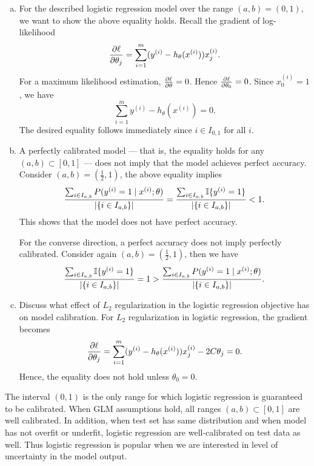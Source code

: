 \documentclass[12pt,letterpaper,boxed]{hmcpset}
\newcommand{\yy}{y^{(i)}}
\newcommand{\xx}{x^{(i)}}
\newcommand{\ind}[1]{\mathbb{I}\{#1\}}
\begin{document}
\begin{solution}
  \begin{enumerate}[(a)]
    \item For the described logistic regression model over the range $(a,b) = (0,1)$, we want to show the above equality holds. Recall the gradient of log-likelihood
    \[
    \pdv{\ell}{\theta_j} = \sum_{i=1}^m (\yy - h_{\theta}(\xx)) \xx_j.
    \]
    For a maximum likelihood estimation, $\pdv{\ell}{\theta} = 0$. Hence $\pdv{\ell}{\theta_0} = 0$. Since $\xx_0 = 1$, we have
    \[
    \sum_{i=1}^{m} \yy - h_\theta(\xx) = 0.
    \]
    The desired equality follows immediately since $i \in I_{0,1}$ for all $i$.

    \item A perfectly calibrated model — that is, the equality holds for any $(a,b) \subset [0,1]$ — does not imply that the model achieves perfect accuracy. Consider $(a,b) = (\frac{1}{2}, 1)$, the above equality implies 
    \[
    \frac{\sum_{i \in I_{a,b}} P(\yy = 1 \mid \xx; \theta)}{\abs{\{i \in I_{a,b}\}}} = \frac{\sum_{i \in I_{a,b}} \ind{\yy = 1}}{\abs{ \{i \in I_{a,b}\} }} < 1.
    \]
    This shows that the model does not have perfect accuracy.

    For the converse direction, a perfect accuracy does not imply perfectly calibrated. Consider again $(a,b) = (\frac{1}{2}, 1)$, then we have
    \[
    \frac{\sum_{i \in I_{a,b}} \ind{\yy = 1}}{\abs{ \{i \in I_{a,b}\} }} = 1 > \frac{\sum_{i \in I_{a,b}} P(\yy = 1 \mid \xx; \theta)}{\abs{\{i \in I_{a,b}\}}}.
    \]

    \item Discuss what effect of $L_2$ regularization in the logistic regression objective has on model calibration. For $L_2$ regularization in logistic regression, the gradient becomes
    \[
    \pdv{\ell}{\theta_j} = \sum_{i=1}^m (\yy - h_{\theta}(\xx)) \xx_j - 2C \theta_j = 0.
    \]
    Hence, the equality does not hold unless $\theta_0 = 0$. 
  \end{enumerate}
\end{solution}

\begin{remark}
  The interval $(0,1)$ is the only range for which logistic regression is guaranteed to be calibrated. When GLM assumptions hold, all ranges $(a,b) \subset [0,1]$ are well calibrated. In addition, when test set has same distribution and when model has not overfit or underfit, logistic regression are well-calibrated on test data as well. Thus logistic regression is popular when we are interested in level of uncertainty in the model output. 
\end{remark}
\end{document}
